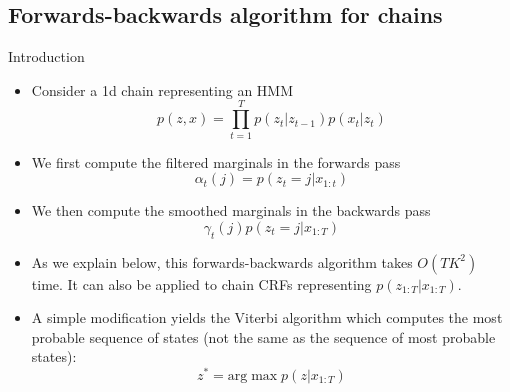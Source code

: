 \documentclass[10pt,mathserif]{beamer}
\begin{document}
\subsection{Forwards-backwards algorithm for chains}
\begin{frame}{Introduction}
\begin{itemize}
    \item Consider a 1d chain representing an HMM 
    \begin{equation}
        p(z, x) = \prod_{t=1}^T p(z_t |z_{t-1})p(x_t |z_t ) 
    \end{equation}
    
    \item We first compute the filtered marginals in the forwards pass 
    \begin{equation}
        \alpha_t(j) = p(z_t = j|x_{1:t})
    \end{equation}
    
    \item We then compute the smoothed marginals in the backwards pass
    \begin{equation}
        \gamma_t(j) p(z_t =j|x_{1:T})
    \end{equation}
    
    \item As we explain below, this forwards-backwards algorithm takes $O(TK^2)$ time. It can also be applied to chain CRFs representing $p(z_{1:T}|x_{1:T})$.
    
    \item A simple modification yields the Viterbi algorithm which computes the most probable sequence of states (not the same as the sequence of most probable states):
    \begin{equation}
        z^* = \text{arg}\max p(z|x_{1:T})
    \end{equation}
\end{itemize}
\end{frame}
\end{document}
